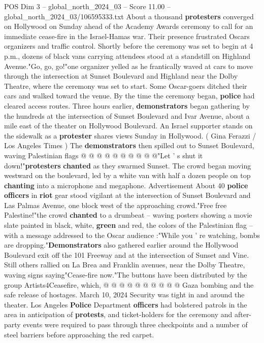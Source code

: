 \begin{textsample}{POS Dim 3 – global\_north\_2024\_03 – Score 11.00 – global\_north\_2024\_03/106595333.txt}  \label{ex:f3_pos_294}
About a thousand \textbf{protesters} converged on Hollywood on Sunday ahead of the Academy Awards ceremony to call for an immediate cease-fire in the Israel-Hamas war.
Their presence frustrated Oscars organizers and traffic control.
Shortly before the ceremony was set to begin at 4 p.m., dozens of black vans carrying attendees stood at a standstill on Highland Avenue."Go, go, go!"one organizer yelled as he frantically waved at cars to move through the intersection at Sunset Boulevard and Highland near the Dolby Theatre, where the ceremony was set to start.
Some Oscar-goers ditched their cars and walked toward the venue.
By the time the ceremony began, \textbf{police} had cleared access routes.
Three hours earlier, \textbf{demonstrators} began gathering by the hundreds at the intersection of Sunset Boulevard and Ivar Avenue, about a mile east of the theater on Hollywood Boulevard.
An Israel supporter stands on the sidewalk as a \textbf{protester} shares views Sunday in Hollywood. ( Gina Ferazzi / Los Angeles Times ) The \textbf{demonstrators} then spilled out to Sunset Boulevard, waving Palestinian flags @ @ @ @ @ @ @ @ @ @"Let ' s shut it down!"\textbf{protesters} \textbf{chanted} as they swarmed Sunset.
The crowd began moving westward on the boulevard, led by a white van with half a dozen people on top \textbf{chanting} into a microphone and megaphone.
Advertisement About 40 \textbf{police} \textbf{officers} in \textbf{riot} gear stood vigilant at the intersection of Sunset Boulevard and Las Palmas Avenue, one block west of the approaching crowd."Free free Palestine!"the crowd \textbf{chanted} to a drumbeat -- waving posters showing a movie slate painted in black, white, \textbf{green} and red, the colors of the Palestinian flag -- with a message addressed to the Oscar audience :"While you ' re watching, bombs are dropping."\textbf{Demonstrators} also gathered earlier around the Hollywood Boulevard exit off the 101 Freeway and at the intersection of Sunset and Vine.
Still others rallied on La Brea and Franklin avenues, near the Dolby Theatre, waving signs saying"Cease-fire now."The buttons have been distributed by the group Artists4Ceasefire, which, @ @ @ @ @ @ @ @ @ @ Gaza bombing and the safe release of hostages.
March 10, 2024 Security was tight in and around the theater.
Los Angeles \textbf{Police} Department \textbf{officers} had bolstered patrols in the area in anticipation of \textbf{protests}, and ticket-holders for the ceremony and after-party events were required to pass through three checkpoints and a number of steel barriers before approaching the red carpet.

\end{textsample}
